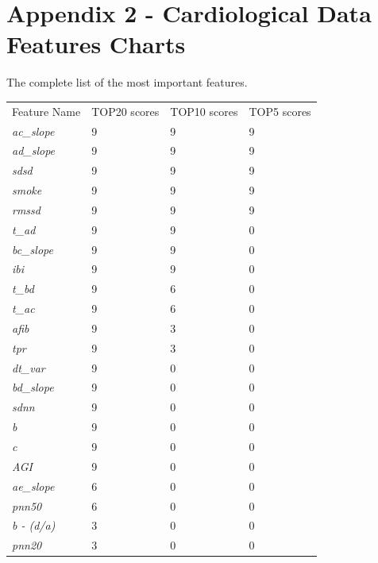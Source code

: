 \documentclass{article}
\begin{document}
\section*{Appendix 2 - Cardiological Data Features Charts} \label{sec:app2}
The complete list of the most important features.
\begin{table}[ht]
\begin{tabular}{llll}
Feature Name       & TOP20 scores  & TOP10 scores  & TOP5 scores \\
\textit{ac\_slope} & 9             & 9             & 9            \\
\textit{ad\_slope} & 9             & 9             & 9            \\
\textit{sdsd}      & 9             & 9             & 9            \\
\textit{smoke}     & 9             & 9             & 9            \\
\textit{rmssd}     & 9             & 9             & 9            \\
\textit{t\_ad}     & 9             & 9             & 0            \\
\textit{bc\_slope} & 9             & 9             & 0            \\
\textit{ibi}       & 9             & 9             & 0            \\
\textit{t\_bd}     & 9             & 6             & 0            \\
\textit{t\_ac}     & 9             & 6             & 0            \\
\textit{afib}      & 9             & 3             & 0            \\
\textit{tpr}       & 9             & 3             & 0            \\
\textit{dt\_var}   & 9             & 0             & 0            \\
\textit{bd\_slope} & 9             & 0             & 0            \\
\textit{sdnn}      & 9             & 0             & 0            \\
\textit{b}         & 9             & 0             & 0            \\
\textit{c}         & 9             & 0             & 0            \\
\textit{AGI}       & 9             & 0             & 0            \\
\textit{ae\_slope} & 6             & 0             & 0            \\
\textit{pnn50}     & 6             & 0             & 0            \\
\textit{b - (d/a)} & 3             & 0             & 0            \\
\textit{pnn20}     & 3             & 0             & 0
\end{tabular}
\end{table}
\end{document}
